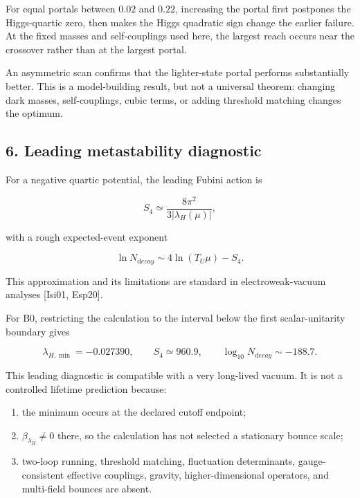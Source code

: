 \documentclass[
]{article}
\providecommand{\tightlist}{%
  \setlength{\itemsep}{0pt}\setlength{\parskip}{0pt}}
\begin{document}
For equal portals between \(0.02\) and \(0.22\), increasing the portal
first postpones the Higgs-quartic zero, then makes the Higgs quadratic
sign change the earlier failure. At the fixed masses and self-couplings
used here, the largest reach occurs near the crossover rather than at
the largest portal.

An asymmetric scan confirms that the lighter-state portal performs
substantially better. This is a model-building result, but not a
universal theorem: changing dark masses, self-couplings, cubic terms, or
adding threshold matching changes the optimum.

\hypertarget{leading-metastability-diagnostic}{%
\subsection{6. Leading metastability
diagnostic}\label{leading-metastability-diagnostic}}

For a negative quartic potential, the leading Fubini action is

\[
S_4\simeq\frac{8\pi^2}{3|\lambda_H(\mu)|},
\]

with a rough expected-event exponent

\[
\ln N_{\mathrm decay}\sim4\ln(T_U\mu)-S_4.
\]

This approximation and its limitations are standard in
electroweak-vacuum analyses {[}Isi01, Esp20{]}.

For B0, restricting the calculation to the interval below the first
scalar-unitarity boundary gives

\[
\lambda_{H,\min}=-0.027390,
\qquad
S_4\simeq960.9,
\qquad
\log_{10}N_{\mathrm decay}\sim-188.7.
\]

This leading diagnostic is compatible with a very long-lived vacuum. It
is not a controlled lifetime prediction because:

\begin{enumerate}
\def\labelenumi{\arabic{enumi}.}
\tightlist
\item
  the minimum occurs at the declared cutoff endpoint;
\item
  \(\beta_{\lambda_H}\ne0\) there, so the calculation has not selected a
  stationary bounce scale;
\item
  two-loop running, threshold matching, fluctuation determinants,
  gauge-consistent effective couplings, gravity, higher-dimensional
  operators, and multi-field bounces are absent.
\end{enumerate}
\end{document}
